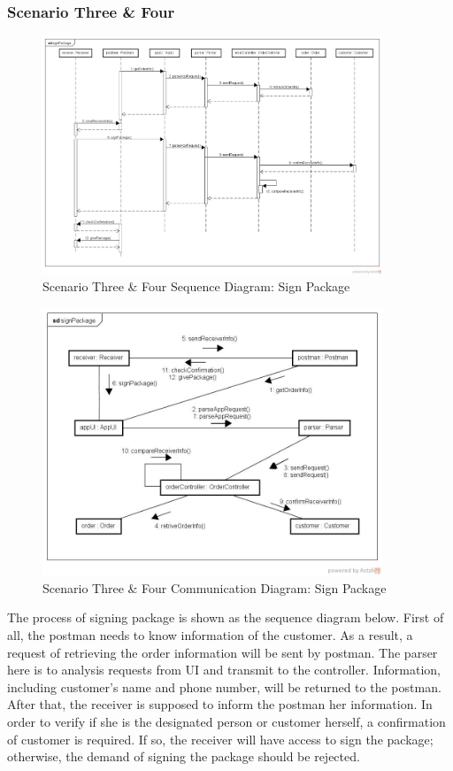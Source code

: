 \documentclass[12pt]{scrreprt}
\begin{document}
\subsubsection{Scenario Three \& Four}
\begin{figure}[H]
  \centering\includegraphics[width=4in]{DocumentRes/34SequenceDiagram_signPackage.png}
  \caption{Scenario Three \& Four Sequence Diagram: Sign Package}
\end{figure}
\begin{figure}[H]
  \centering\includegraphics[width=4in]{DocumentRes/34CommunicationDiagram_signPackage.png}
  \caption{Scenario Three \& Four Communication Diagram: Sign Package}
\end{figure}
The process of signing package is shown as the sequence diagram below. First of all, the postman needs to know information of the customer. As a result, a request of retrieving the order information will be sent by postman. The parser here is to analysis requests from UI and transmit to the controller. Information, including customer's name and phone number, will be returned to the postman. After that, the receiver is supposed to inform the postman her information. In order to verify if she is the designated person or customer herself, a confirmation of customer is required. If so, the receiver will have access to sign the package; otherwise, the demand of signing the package should be rejected.
\end{document}
